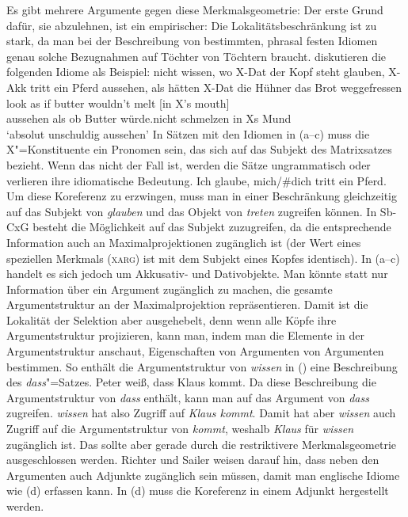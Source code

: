 Es gibt mehrere Argumente gegen diese Merkmalsgeometrie: Der erste Grund dafür, sie abzulehnen, ist ein empirischer: Die
Lokalitätsbeschränkung ist zu stark, da man bei der Beschreibung von bestimmten, phrasal festen
Idiomen genau solche Bezugnahmen auf Töchter von Töchtern braucht.  diskutieren die folgenden Idiome als
Beispiel:
\eal
\ex nicht wissen, wo X-Dat der Kopf steht
\ex\label{mich-tritt-ein-Pferd}
glauben, X-Akk tritt ein Pferd
\ex aussehen, als hätten X-Dat die Hühner das Brot weggefressen
\ex
\gll look as if butter wouldn't melt [in X's mouth]\\
     aussehen als ob Butter würde.nicht schmelzen \hphantom{[}in Xs Mund\\
\glt `absolut unschuldig aussehen'
\zl
In Sätzen mit den Idiomen in (a--c) muss die X"=Konstituente ein Pronomen sein, das sich auf
das Subjekt des Matrixsatzes bezieht. Wenn das nicht der Fall ist, werden die Sätze ungrammatisch
oder verlieren ihre idiomatische Bedeutung.
\ea
Ich glaube, mich/\#dich tritt ein Pferd.
\z
Um diese Koreferenz zu erzwingen, muss man in einer Beschränkung gleichzeitig auf das Subjekt von
\emph{glauben} und das Objekt von \emph{treten} zugreifen können. In Sb-CxG besteht die Möglichkeit
auf das Subjekt zuzugreifen, da die entsprechende Information auch an Maximalprojektionen zugänglich
ist (der Wert eines speziellen Merkmals (\textsc{xarg}) ist mit dem Subjekt eines Kopfes identisch). In
(a--c) handelt es sich jedoch um Akkusativ- und Dativobjekte. Man könnte statt nur
Information über ein Argument zugänglich zu machen, die gesamte Argumentstruktur an der
Maximalprojektion repräsentieren. Damit ist die Lokalität der Selektion aber ausgehebelt, denn wenn
alle Köpfe ihre Argumentstruktur projizieren, kann man, indem man die Elemente in der
Argumentstruktur anschaut, Eigenschaften von Argumenten von Argumenten bestimmen. So enthält \zb die
Argumentstruktur von \emph{wissen} in () eine Beschreibung des \emph{dass}"=Satzes.
\ea
Peter weiß, dass Klaus kommt.
\z
Da diese Beschreibung die Argumentstruktur von \emph{dass} enthält, kann man auf das Argument von
\emph{dass} zugreifen. \emph{wissen} hat also Zugriff auf \emph{Klaus kommt}. Damit hat aber
\emph{wissen} auch Zugriff auf die Argumentstruktur von \emph{kommt}, weshalb \emph{Klaus} für
\emph{wissen} zugänglich ist. Das sollte aber gerade durch die restriktivere Merkmalsgeometrie
ausgeschlossen werden. Richter und Sailer weisen darauf hin, dass neben den Argumenten auch Adjunkte
zugänglich sein müssen, damit man englische Idiome wie (d) erfassen kann. In (d)
muss die Koreferenz in einem Adjunkt hergestellt werden.

